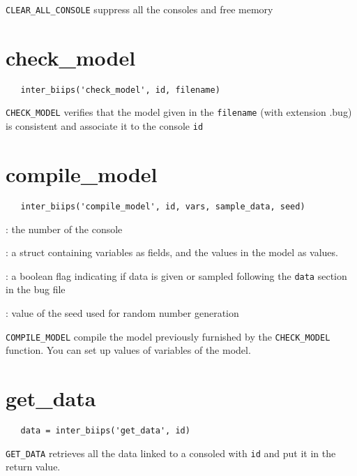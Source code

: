 \documentclass[11pt,twoside]{article}
\begin{document}
  \texttt{CLEAR\_ALL\_CONSOLE} suppress all the consoles and free memory

\section{check\_model}

 \begin{lstlisting}
   inter_biips('check_model', id, filename)
 \end{lstlisting}
  
 \texttt{CHECK\_MODEL} verifies that the model given in the \texttt{filename} (with extension .bug) is consistent and associate it to the console \texttt{id}

\section{compile\_model}

 \begin{lstlisting}
   inter_biips('compile_model', id, vars, sample_data, seed) 
 \end{lstlisting}
   \begin{description}
   \setlength{\baselineskip}{0.1\baselineskip}
     \item[\texttt{id}]: the number of the console
     \item[\texttt{vars}]: a struct containing variables as fields, and the values in the model as values.
     \item[\texttt{sample\_data}]: a boolean flag indicating if data is given or sampled following the \texttt{data} section in the bug file
     \item[\texttt{seed}]: value of the seed used for random number generation
   
   \end{description}

   \texttt{COMPILE\_MODEL} compile the model previously furnished by the \texttt{CHECK\_MODEL} function. You can set up values of variables of 
   the model.


\section{get\_data}
   
 \begin{lstlisting}
   data = inter_biips('get_data', id) 
 \end{lstlisting}
 
  \texttt{GET\_DATA} retrieves all the data linked to a consoled with \texttt{id} and put it in the return value.
\end{document}
